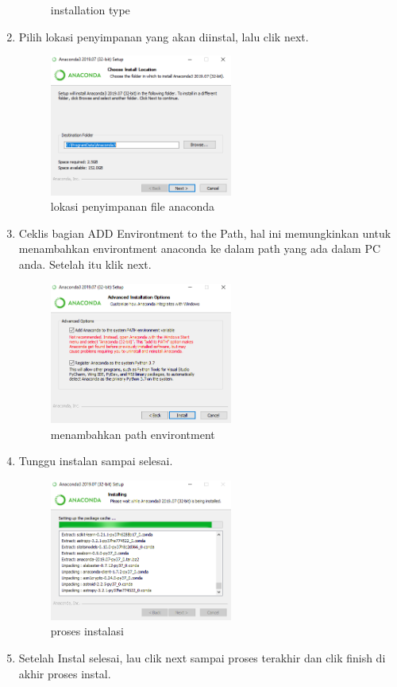 \begin{enumerate}
\begin{figure}[h]
			\centering
			\caption{installation type}
			\end{figure}
		\item Pilih lokasi penyimpanan yang akan diinstal, lalu clik next.
			\begin{figure}[h]
			\includegraphics[width=6cm]{figure/4.png}
			\centering
			\caption{lokasi penyimpanan file anaconda}
			\end{figure}
		\item Ceklis bagian ADD Environtment to the Path, hal ini memungkinkan untuk menambahkan environtment anaconda ke dalam path yang ada dalam PC anda. Setelah itu klik next.
			\begin{figure}[h]
			\includegraphics[width=6cm]{figure/5.png}
			\centering
			\caption{menambahkan path environtment}
			\end{figure}
		\item Tunggu instalan sampai selesai.
			\begin{figure}[h]
			\includegraphics[width=6cm]{figure/7.png}
			\centering
			\caption{proses instalasi}
			\end{figure}
		\item Setelah Instal selesai, lau clik next sampai proses terakhir dan clik finish di akhir proses instal.

\end{enumerate}
